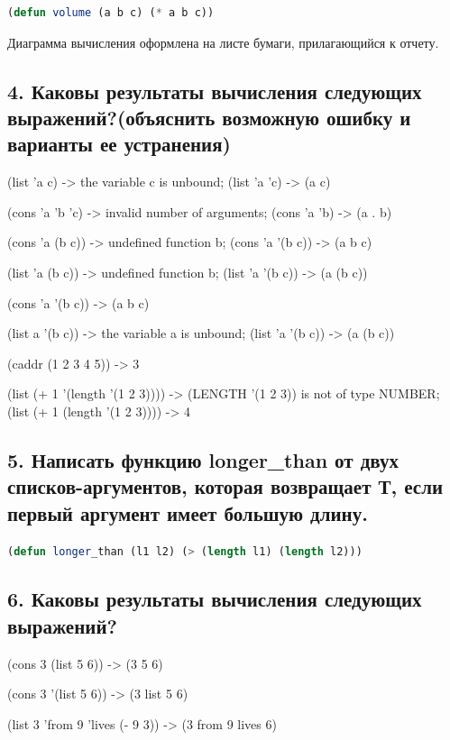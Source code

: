 \documentclass[12pt]{report}
\begin{document}
\begin{lstlisting}[label=6xd, caption=Решение задания №3, language=lisp]
	(defun volume (a b c) (* a b c))
\end{lstlisting}

Диаграмма вычисления оформлена на листе бумаги, прилагающийся к отчету.

\subsection*{4. Каковы результаты вычисления следующих выражений?(объяснить возможную ошибку и варианты ее устранения)}

(list 'a c) -> the variable c is unbound; (list 'a 'c) -> (a c)

(cons 'a 'b 'c) -> invalid number of arguments; (cons 'a 'b) -> (a . b)

(cons 'a (b c)) -> undefined function b; (cons 'a '(b c)) -> (a b c)

(list 'a (b c)) -> undefined function b; (list 'a '(b c)) -> (a (b c))

(cons 'a '(b c)) -> (a b c)

(list a '(b c)) -> the variable a is unbound; (list 'a '(b c)) -> (a (b c))

(caddr (1 2 3 4 5)) -> 3

(list (+ 1 '(length '(1 2 3)))) -> (LENGTH '(1 2 3)) is not of type NUMBER; (list (+ 1 (length '(1 2 3)))) -> 4


\subsection*{5. Написать функцию longer\_than от двух списков-аргументов, которая возвращает Т, если первый аргумент имеет большую длину.}

\begin{lstlisting}[label=5xd,caption=Решение задания №5, language=lisp]
	(defun longer_than (l1 l2) (> (length l1) (length l2)))
\end{lstlisting}

\subsection*{6. Каковы результаты вычисления следующих выражений?}

(cons 3 (list 5 6)) -> (3 5 6)

(cons 3 '(list 5 6)) -> (3 list 5 6)

(list 3 'from 9 'lives (- 9 3)) -> (3 from 9 lives 6)
\end{document}
